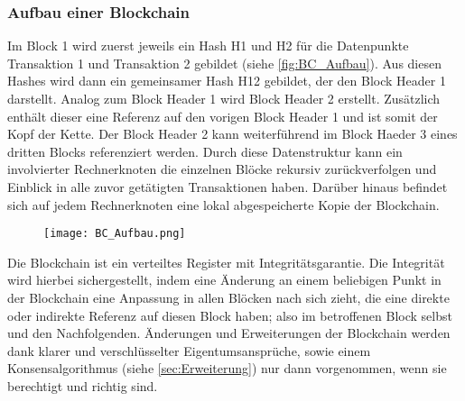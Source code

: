\subsubsection{Aufbau einer Blockchain}
Im Block 1 wird zuerst jeweils ein Hash H1 und H2 für die Datenpunkte Transaktion 1 
und Transaktion 2 gebildet (siehe \autoref{fig:BC_Aufbau}). Aus diesen Hashes wird dann ein gemeinsamer Hash H12 gebildet, 
der den Block Header 1 darstellt.
Analog zum Block Header 1 wird Block Header 2 erstellt. Zusätzlich enthält dieser eine
Referenz auf den vorigen Block Header 1 und ist somit der Kopf der Kette. Der Block Header 2
kann weiterführend im Block Haeder 3 eines dritten Blocks referenziert werden. 
Durch diese Datenstruktur kann ein involvierter Rechnerknoten die einzelnen Blöcke rekursiv
zurückverfolgen und Einblick in alle zuvor getätigten Transaktionen haben. Darüber
hinaus befindet sich auf jedem Rechnerknoten eine lokal abgespeicherte Kopie der 
Blockchain.
\cite[p.~17f]{fill2020blockchain}

\begin{figure}[h]
    \begin{center}
        \texttt{[image: BC\_Aufbau.png]}
    \end{center}
    \label{fig:BC_Aufbau}
\end{figure}

Die Blockchain ist  ein verteiltes Register mit Integritätsgarantie. Die Integrität 
wird hierbei sichergestellt, indem eine Änderung an einem beliebigen Punkt in der
Blockchain eine Anpassung in allen Blöcken nach sich zieht, die eine direkte oder
indirekte Referenz auf diesen Block haben; also im betroffenen Block selbst und den
Nachfolgenden. Änderungen und Erweiterungen der Blockchain werden dank klarer 
und verschlüsselter Eigentumsansprüche, sowie einem Konsensalgorithmus (siehe \ref{sec:Erweiterung})
nur dann vorgenommen, wenn sie berechtigt und richtig sind.
\cite[p.~22]{fill2020blockchain} 

